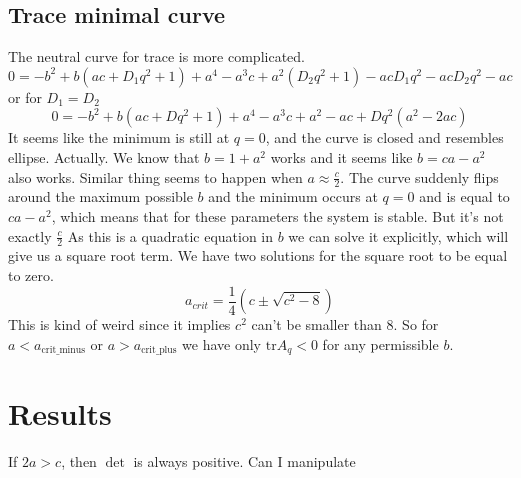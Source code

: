 \documentclass{article}
\newcommand{\tr}{\text{tr}}
\begin{document}
\subsection{Trace minimal curve}
The neutral curve  for trace is more complicated. 
\begin{equation}
0=-b^2 + b \left(a c+D_1 q^2+1\right)+a^4-a^3 c+a^2 \left(D_2 q^2+1\right)-a c D_1 q^2-a c D_2 q^2-a c
\end{equation}
or for $D_1=D_2$
\begin{equation}
0 = -b^2 + b \left(a c+D q^2+1\right) + a^4-a^3c+a^2-ac + Dq^2(a^2-2ac)
\end{equation}
It seems like the minimum is still at $q=0$, and the curve is closed and resembles ellipse. 
Actually. We know that $b=1+a^2$ works and it seems like $b = ca-a^2$ also works.
Similar thing seems to happen when $a\approx\frac{c}{2}$. The curve suddenly flips around the maximum possible $b$ and the minimum occurs at $q=0$ and is equal to $ca-a^2$, which means that for these parameters the system is stable.
But it's not exactly $\frac{c}{2}$
As this is a quadratic equation in $b$ we can solve it explicitly, which will give us a square root term.
We have two solutions for the square root to be equal to zero.
\begin{equation}
a_{crit} = \frac{1}{4}(c\pm\sqrt{c^2-8})
\end{equation}
This is kind of weird since it implies $c^2$ can't be smaller than $8$.
So for $a<a_{\text{crit\_minus}}$ or $a> a_{\text{crit\_plus}}$ we have only $\tr A_q <0$ for any permissible $b$.

\section{Results}
If $2a>c$, then $\det $ is always positive. Can I manipulate 
\end{document}
